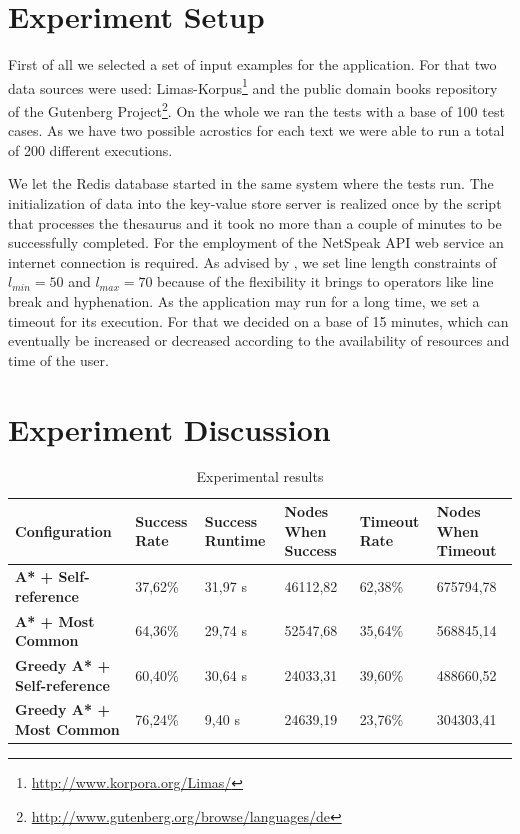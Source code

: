 \documentclass[11pt]{reportAlternative}
\begin{document}
\section{Experiment Setup}
First of all we selected a set of input examples for the application. For that two data sources were used: Limas-Korpus\footnote{\url{http://www.korpora.org/Limas/}} and the public domain books repository of the Gutenberg Project\footnote{\url{http://www.gutenberg.org/browse/languages/de}}. On the whole we ran the tests with a base of  100 test cases. As we have two possible acrostics for each text we were able to run a total of 200 different executions.

We let the Redis database started in the same system where the tests run. The initialization of data into the key-value store server is realized once by the script that processes the thesaurus and it took no more than a couple of minutes to be successfully completed. For the employment of the NetSpeak API web service an internet connection is required. As advised by \cite{Stein}, we set line length constraints of $l_{min} = 50$ and $l_{max} = 70$ because of the flexibility it brings to operators like line break and hyphenation. As the application may run for a long time, we set a timeout for its execution. For that we decided on a base of 15 minutes, which can eventually be increased or decreased according to the availability of resources and time of the user.

\section{Experiment Discussion}

\begin{table}[h]
\centering
\begin{tabular}{p{3cm} | p{2cm} | p{2cm} | p{2.5cm} | p{2cm} | p{2.5cm}}
	\hline
	\textbf{Configuration} & \textbf{Success Rate} & \textbf{Success Runtime} & \textbf{Nodes When Success} & \textbf{Timeout Rate} & \textbf{Nodes When Timeout} \\ \hline
	\textbf{A* + Self-reference}	& 37,62\%	& 31,97 s	& 46112,82	& 62,38\%	& 675794,78 \\ \hline
	\textbf{A* + Most Common}		& 64,36\%	& 29,74 s	& 52547,68	& 35,64\%	& 568845,14 \\ \hline
	\textbf{Greedy A* + Self-reference}	& 60,40\%	& 30,64 s	& 24033,31	& 39,60\%	& 488660,52 \\ \hline
	\textbf{Greedy A* + Most Common}	& 76,24\%	& 9,40 s	& 24639,19	& 23,76\%	& 304303,41 \\ \hline
\end{tabular}
\label{tab:results}
\caption{Experimental results}
\end{table}
\end{document}
